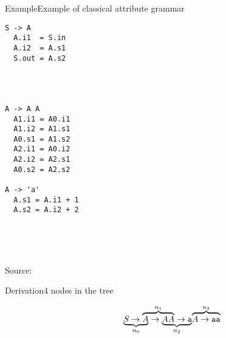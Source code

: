 \begin{frame}[fragile=singleslide]{Example}{Example of classical attribute grammar}
    
\begin{multicols}{3}
\begin{verbatim}
S -> A
  A.i1  = S.in
  A.i2  = A.s1
  S.out = A.s2




A -> A A
  A1.i1 = A0.i1
  A1.i2 = A1.s1
  A0.s1 = A1.s2
  A2.i1 = A0.i2
  A2.i2 = A2.s1
  A0.s2 = A2.s2

A -> 'a'
  A.s1 = A.i1 + 1
  A.s2 = A.i2 + 2
    
    
    
    
\end{verbatim}
\end{multicols}

Source: \cite{10.1145/225540.225544}
    
\end{frame}



\begin{frame}[fragile=singleslide]{Derivation}{4 nodes in the tree}

\[
\lefteqn{\underbrace{\phantom{S \rightarrow A}}_{n_0}} S \rightarrow
\lefteqn{\overbrace{\phantom{A \rightarrow A A}}^{n_1}} A \rightarrow 
\lefteqn{\underbrace{\phantom{A A \rightarrow \texttt{a}}}_{n_2}} A A \rightarrow \texttt{a}
\lefteqn{\overbrace{A \rightarrow \texttt{aa}}^{n_3}}
\]

\begin{center}
\scalebox{0.75}{\begin{forest}
  [
    $n_0$, name=n0
    [ $n_1$
        [$n_2$ [$\texttt{a}$]]
        [$n_3$ [$\texttt{a}$]]
    ]
  ]
\end{forest}}
\end{center}

\end{frame}


